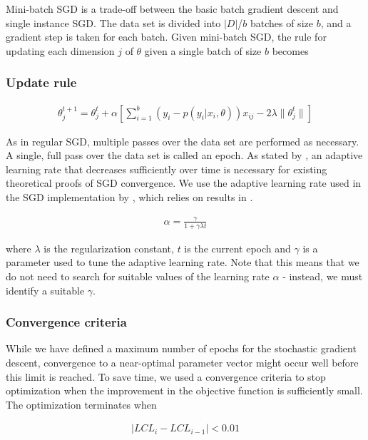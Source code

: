 Mini-batch SGD is a trade-off between the basic batch gradient descent and single instance SGD\citep{cotter2011batchsgd}. The data set is divided into $|D|$/$b$ batches of size $b$, and a gradient step is taken for each batch. Given mini-batch SGD, the rule for updating each dimension $j$ of $\theta$ given a single batch of size $b$ becomes

\subsubsection{Update rule}

\begin{eqnarray}
\theta^{t+1}_j = \theta^{t}_j + \alpha[\sum_{i=1}^{b}(y_i - p(y_i | x_i,\theta))x_{ij} - 2\lambda \|\theta^{t}_j\|]
\end{eqnarray}

As in regular SGD, multiple passes over the data set are performed as necessary. A single, full pass over the data set is called an epoch. As stated by \cite{cotter2011batchsgd}, an adaptive learning rate that decreases sufficiently over time is necessary for existing theoretical proofs of SGD convergence. We use the adaptive learning rate used in the SGD implementation by \cite{bottou2011sgd}, which relies on results in \citep{xu2010learningrate}.

\begin{eqnarray}
\label{eq:learning_rate}
\alpha = \frac{\gamma}{1 + \gamma\lambda t}
\end{eqnarray}

where $\lambda$ is the regularization constant, $t$ is the current epoch and $\gamma$ is a parameter used to tune the adaptive learning rate. Note that this means that we do not need to search for suitable values of the learning rate $\alpha$ - instead, we must identify a suitable $\gamma$.

\subsubsection{Convergence criteria}

While we have defined a maximum number of epochs for the stochastic gradient descent, convergence to a near-optimal parameter vector might occur well before this limit is reached. To save time, we used a convergence criteria to stop optimization when the improvement in the objective function is sufficiently small. The optimization terminates when 

\begin{eqnarray}
|LCL_i - LCL_{i-1}| < 0.01
\end{eqnarray}

